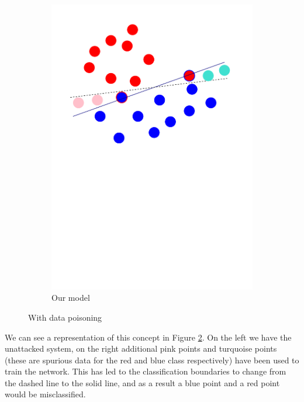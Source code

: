 \begin{figure}[h!]
\begin{subfigure}{.4\textwidth}
		\includegraphics[width=\textwidth]{data_poisoning}
		\caption{Our model}
		\label{fig:poison}
	\end{subfigure}
	\caption{With data poisoning}
	\label{fig:poisoning}
\end{figure}

We can see a representation of this concept in Figure \ref{fig:poisoning}. On the left we have the unattacked system, on the right additional pink points and turquoise points (these are spurious data for the red and blue class respectively) have been used to train the network. This has led to the classification boundaries to change from the dashed line to the solid line, and as a result a blue point and a red point would be misclassified.

